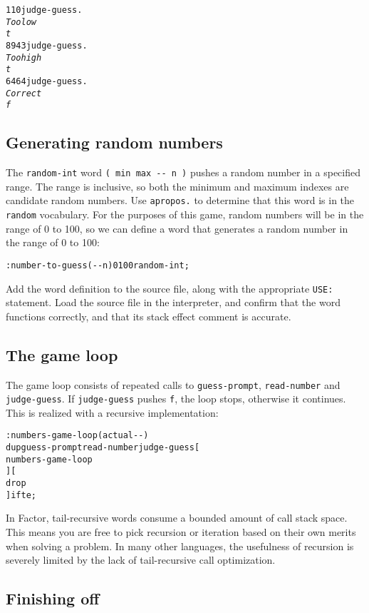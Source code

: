 \documentclass[english]{article}
\begin{document}
\begin{alltt}
1 10 judge-guess .
\emph{Too low}
\emph{t}
89 43 judge-guess .
\emph{Too high}
\emph{t}
64 64 judge-guess .
\emph{Correct}
\emph{f}
\end{alltt}

\subsection{Generating random numbers}

The \texttt{random-int} word \texttt{( min max -{}- n )} pushes a
random number in a specified range. The range is inclusive, so both
the minimum and maximum indexes are candidate random numbers. Use
\texttt{apropos.} to determine that this word is in the \texttt{random}
vocabulary. For the purposes of this game, random numbers will be
in the range of 0 to 100, so we can define a word that generates a
random number in the range of 0 to 100:

\begin{alltt}
: number-to-guess ( -{}- n ) 0 100 random-int ;
\end{alltt}
Add the word definition to the source file, along with the appropriate
\texttt{USE:} statement. Load the source file in the interpreter,
and confirm that the word functions correctly, and that its stack
effect comment is accurate.


\subsection{The game loop}

The game loop consists of repeated calls to \texttt{guess-prompt},
\texttt{read-number} and \texttt{judge-guess}. If \texttt{judge-guess}
pushes \texttt{f}, the loop stops, otherwise it continues. This is
realized with a recursive implementation:

\begin{alltt}
: numbers-game-loop ( actual -{}- )
    dup guess-prompt read-number judge-guess {[}
        numbers-game-loop
    {]} {[}
        drop
    {]} ifte ;
\end{alltt}
In Factor, tail-recursive words consume a bounded amount of call stack
space. This means you are free to pick recursion or iteration based
on their own merits when solving a problem. In many other languages,
the usefulness of recursion is severely limited by the lack of tail-recursive
call optimization.


\subsection{Finishing off}
\end{document}
